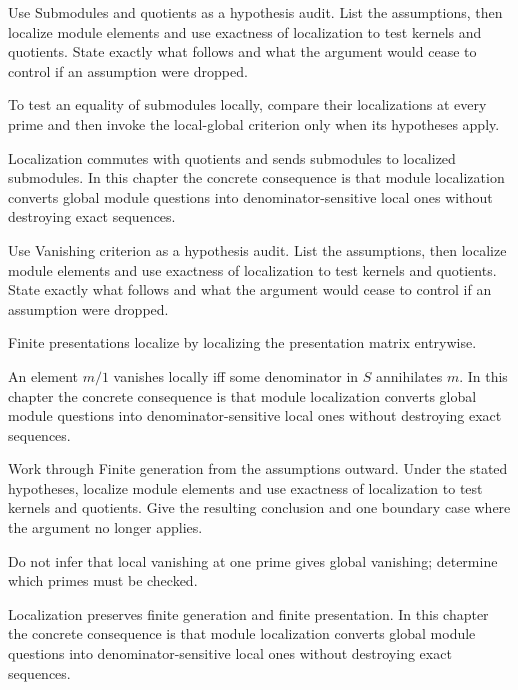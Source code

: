 \begin{exercise}\label{exr:v07-06}
Use Submodules and quotients as a hypothesis audit. List the assumptions, then localize module elements and use exactness of localization to test kernels and quotients. State exactly what follows and what the argument would cease to control if an assumption were dropped.
\end{exercise}
\begin{hint}
To test an equality of submodules locally, compare their localizations at every prime and then invoke the local-global criterion only when its hypotheses apply.
\end{hint}
\begin{solution}
Localization commutes with quotients and sends submodules to localized submodules. In this chapter the concrete consequence is that module localization converts global module questions into denominator-sensitive local ones without destroying exact sequences.
\end{solution}

\begin{exercise}\label{exr:v07-07}
Use Vanishing criterion as a hypothesis audit. List the assumptions, then localize module elements and use exactness of localization to test kernels and quotients. State exactly what follows and what the argument would cease to control if an assumption were dropped.
\end{exercise}
\begin{hint}
Finite presentations localize by localizing the presentation matrix entrywise.
\end{hint}
\begin{solution}
An element $m/1$ vanishes locally iff some denominator in $S$ annihilates $m$. In this chapter the concrete consequence is that module localization converts global module questions into denominator-sensitive local ones without destroying exact sequences.
\end{solution}

\begin{exercise}\label{exr:v07-08}
Work through Finite generation from the assumptions outward. Under the stated hypotheses, localize module elements and use exactness of localization to test kernels and quotients. Give the resulting conclusion and one boundary case where the argument no longer applies.
\end{exercise}
\begin{hint}
Do not infer that local vanishing at one prime gives global vanishing; determine which primes must be checked.
\end{hint}
\begin{solution}
Localization preserves finite generation and finite presentation. In this chapter the concrete consequence is that module localization converts global module questions into denominator-sensitive local ones without destroying exact sequences.
\end{solution}

